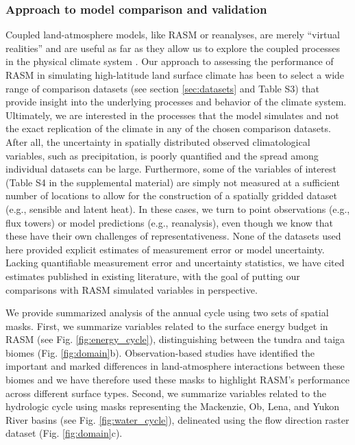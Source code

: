 \subsubsection{Approach to model comparison and validation}

Coupled land-atmosphere models, like RASM or reanalyses, are merely ``virtual realities'' and are useful as far as they allow us to explore the coupled processes in the physical climate system \citep{Betts_2004}.
Our approach to assessing the performance of RASM in simulating high-latitude land surface climate has been to select a wide range of comparison datasets (see section \ref{sec:datasets} and Table S3) that provide insight into the underlying processes and behavior of the climate system.
Ultimately, we are interested in the processes that the model simulates and not the exact replication of the climate in any of the chosen comparison datasets.
After all, the uncertainty in spatially distributed observed climatological variables, such as precipitation, is poorly quantified and the spread among individual datasets can be large.
Furthermore, some of the variables of interest (Table S4 in the supplemental material) are simply not measured at a sufficient number of locations to allow for the construction of a spatially gridded dataset (e.g., sensible and latent heat).
In these cases, we turn to point observations (e.g., flux towers) or model predictions (e.g., reanalysis), even though we know that these have their own challenges of representativeness.
None of the datasets used here provided explicit estimates of measurement error or model uncertainty.
Lacking quantifiable measurement error and uncertainty statistics, we have cited estimates published in existing literature, with the goal of putting our comparisons with RASM simulated variables in perspective.

We provide summarized analysis of the annual cycle using two sets of spatial masks.
First, we summarize variables related to the surface energy budget in RASM (see Fig. \ref{fig:energy_cycle}), distinguishing between the tundra and taiga biomes \citep{Olson_2001} (Fig. \ref{fig:domain}b).
Observation-based studies have identified the important and marked differences in land-atmosphere interactions between these biomes \citep{Beringer_2005,Chapin_2000a,Chapin_2000b} and we have therefore used these masks to highlight RASM’s performance across different surface types.
Second, we summarize variables related to the hydrologic cycle using masks representing the Mackenzie, Ob, Lena, and Yukon River basins (see Fig. \ref{fig:water_cycle}), delineated using the \citet{Wu_2011} flow direction raster dataset (Fig. \ref{fig:domain}c).


